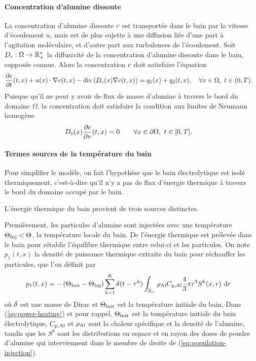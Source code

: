 \paragraph{Concentration d'alumine dissoute}
La concentration d'alumine dissoute $c$ est transportée
dans le bain par la vitesse d'écoulement $u$, mais est de plus sujette
à une diffusion liée d'une part à l'agitation moléculaire, et d'autre
part aux turbulences de l'écoulement. Soit
$D_c:\Omega\to\mathbb R^*_+$ la diffusivité de la
concentration d'alumine dissoute dans le bain, supposée connue. Alors
la concentration $c$ doit satisfaire l'équation
\begin{equation}\label{eq:concentration}
  \frac{\partial c}{\partial t}(t, x) + u(x)\cdot\nabla c(t, x) - \mathrm{div}\left( D_c(x)
  \nabla c(t, x) \right) = q_1(x) + q_2(t, x),\quad \forall
  x\in\Omega,\ t\in (0, T).
\end{equation}
Puisque qu'il ne peut y avoir de flux de masse d'alumine à travers le
bord du domaine $\Omega$, la concentration doit satisfaire la
condition aux limites de Neumann homogène
\begin{equation}\label{eq:c-bc}
  D_{c}(x)\frac{\partial c}{\partial \nu}(t, x) = 0 \quad  \quad
  \forall x\in\partial \Omega,\ t\in[0, T].
\end{equation}

\paragraph{Termes sources de la température du bain}
Pour simplifier le modèle, on fait l'hypothèse que le bain
électrolytique est isolé thermiquement, c'est-à-dire qu'il n'y a pas
de flux d'énergie thermique à travers le bord du domaine occupé par le
bain.

L'énergie thermique du bain provient de trois sources distinctes.

Premièrement, les particules d'alumine sont injectées avec
une température $\Theta_\text{Inj} < \Theta$, la température locale du
bain. De l'énergie thermique est prélevée dans le bain pour rétablir
l'équilibre thermique entre celui-ci et les particules. On note $p_1(t,
x)$ la densité de puissance thermique extraite du bain pour réchauffer
les particules, que l'on définit par
\begin{equation}\label{eq:power-heating}
  p_1(t, x) = -\left( \Theta_\text{Init}-\Theta_\text{Inj} \right)\sum_{k = 1}^{K}\delta(t -
  \tau^k)\int_{\mathbb R_+}\rho_\mathrm{Al}C_{\mathrm{p,Al}}\frac{4}{3}\pi r^3 S^k(x, r)\,\,\mathrm dr
\end{equation}
où $\delta$ est une masse de Dirac et $\Theta_\text{Init}$ est la température
initiale du bain. Dans (\ref{eq:power-heating}) et pour rappel, $\Theta_\text{Init}$ est la
température initiale du bain électrolytique, $C_{\mathrm{p,Al}}$ et
$\rho_\mathrm{Al}$ sont la chaleur spécifique et la densité de
l'alumine, tandis que les $S^k$ sont les distributions en espace et en
rayon des doses de poudre d'alumine qui interviennent dans le membre
de droite de (\ref{eq:population-injection}).

